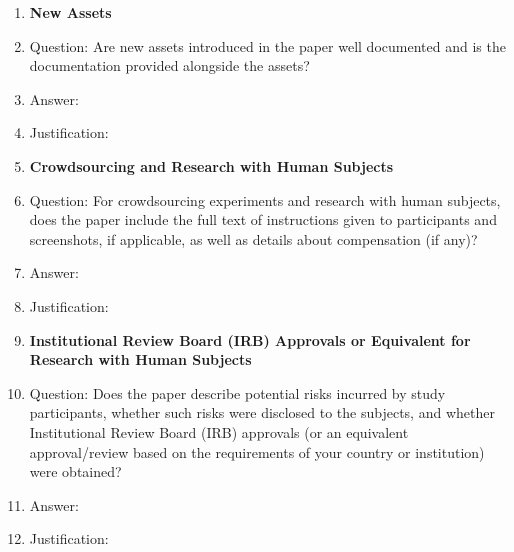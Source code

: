 \documentclass{article}
\begin{document}
\begin{enumerate}
\item {\bf New Assets}
    \item[] Question: Are new assets introduced in the paper well documented and is the documentation provided alongside the assets?
    \item[] Answer: \answerTODO{}
    \item[] Justification: \justificationTODO{}

\item {\bf Crowdsourcing and Research with Human Subjects}
    \item[] Question: For crowdsourcing experiments and research with human subjects, does the paper include the full text of instructions given to participants and screenshots, if applicable, as well as details about compensation (if any)?
    \item[] Answer: \answerTODO{}
    \item[] Justification: \justificationTODO{}

\item {\bf Institutional Review Board (IRB) Approvals or Equivalent for Research with Human Subjects}
    \item[] Question: Does the paper describe potential risks incurred by study participants, whether such risks were disclosed to the subjects, and whether Institutional Review Board (IRB) approvals (or an equivalent approval/review based on the requirements of your country or institution) were obtained?
    \item[] Answer: \answerTODO{}
    \item[] Justification: \justificationTODO{}

\end{enumerate}



\end{document}
